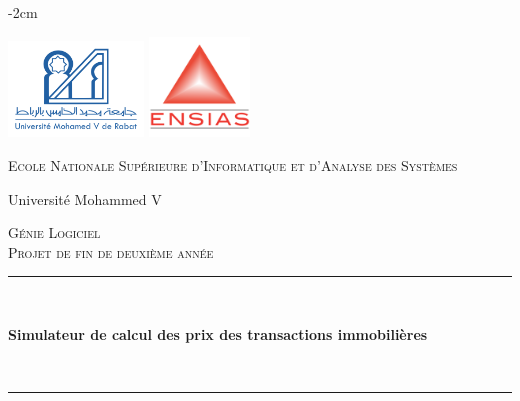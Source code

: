 \documentclass[a4paper,12pt]{report}
\numberwithin{equation}{section}
\begin{document}
\begin{titlepage}
    \changepage{2cm}%
               {}%
               {}%
               {}%
               {}%
               {-2cm}%
               {}%
               {}%
               {}%
    
    \setlength{\wpYoffset}{-7cm}    
        \flushleft
        \includegraphics[width=0.27\textwidth]{um5.png} %
        \hfill
        \includegraphics[width=0.20\textwidth]{ENSIAS.png}\par\vspace{1cm}
        \centering 
        {\scshape\LARGE Ecole Nationale Supérieure d'Informatique et d'Analyse des Systèmes \par Université Mohammed V  \par} %
        \vspace{1.5cm}%
        {\scshape\Large Génie Logiciel \\ Projet de fin de deuxième année	\par} %
        \vspace{1cm}%
        \rule{\linewidth}{0.2 mm} \\[0.4 cm]
        {\huge\bfseries Simulateur de calcul des prix des transactions immobilières \par} \
        \rule{\linewidth}{0.2 mm} \\[1.5 cm]
        \vspace{3cm}%
        

\end{titlepage}
\end{document}
